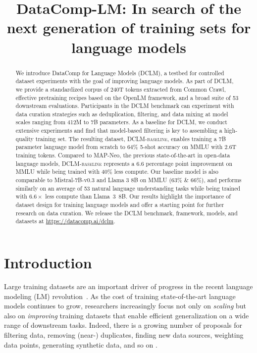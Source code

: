 \title{DataComp-LM: In search of the next generation of training sets for language models}

\begin{abstract}
We introduce DataComp for Language Models (\textsc{DCLM}), a testbed for controlled dataset experiments with the goal of improving language models. As part of \textsc{DCLM}, we provide a standardized corpus of 240T tokens extracted from Common Crawl, effective pretraining recipes based on the OpenLM framework, and a broad suite of 53 downstream evaluations. Participants in the \textsc{DCLM} benchmark can experiment with data curation strategies such as deduplication, filtering, and data mixing at model scales ranging from 412M to 7B parameters. As a baseline for \textsc{DCLM}, we conduct extensive experiments and find that model-based filtering is key to assembling a high-quality training set. The resulting dataset, \textsc{DCLM-baseline}, enables training a 7B parameter language model from scratch to $64$\% 5-shot accuracy on MMLU with 2.6T training tokens. Compared to MAP-Neo, the previous state-of-the-art in open-data language models, \textsc{DCLM-baseline} represents a 6.6 percentage point improvement on MMLU while being trained with 40\% less compute. Our baseline model is also comparable to Mistral-7B-v0.3 and Llama 3 8B on MMLU (63\% \& 66\%), and performs similarly on an average of 53 natural language understanding tasks while being trained with $6.6 \times$ less compute than Llama~3~8B. Our results highlight the importance of dataset design for training language models and offer a starting point for further research on data curation. We release the \textsc{DCLM} benchmark, framework, models, and datasets at \url{https://datacomp.ai/dclm}.
\end{abstract}

\section{Introduction}
\label{sec:intro}

Large training datasets are an important driver of progress in the recent language modeling (LM) revolution~\citep{kaplan2020scaling,raffel2020exploring,soldaini2024dolma,pile,peng-etal-2023-rwkv,k2llm360,workshop2022bloom,glorioso2024zamba}. As the cost of training state-of-the-art language models continues to grow, researchers increasingly focus not only on \emph{scaling} but also on \emph{improving} training datasets that enable efficient generalization on a wide range of downstream tasks. Indeed, there is a growing number of proposals for filtering data, removing (near-) duplicates, finding new data sources, weighting data points, generating synthetic data, and so on \citep{muennighoff2023scaling,Lee2021DeduplicatingTD,albalak2024survey,xie2023doremi,liu2024best,gunasekar2023textbooks,li2023textbooks,abdin2024phi}.

